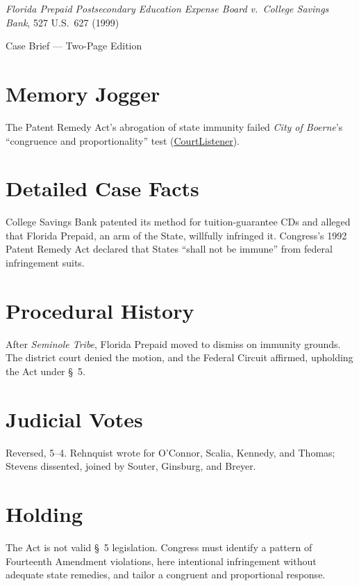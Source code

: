 \documentclass[12pt]{article}
\begin{document}
\begin{center}
{\LARGE \textit{Florida Prepaid Postsecondary Education Expense Board v.\ College Savings Bank}, 527 U.S.\ 627 (1999)\par}
\vspace{0.5em}
{\large Case Brief --- Two-Page Edition\par}
\end{center}

\section{Memory Jogger}
The Patent Remedy Act's abrogation of state immunity failed \textit{City of Boerne}'s ``congruence and proportionality'' test (\href{https://www.courtlistener.com/opinion/118316/florida-prepaid-postsecondary-education-expense-board-v-college-savings/}{CourtListener}).

\section{Detailed Case Facts}
College Savings Bank patented its method for tuition-guarantee CDs and alleged that Florida Prepaid, an arm of the State, willfully infringed it. Congress's 1992 Patent Remedy Act declared that States ``shall not be immune'' from federal infringement suits.

\section{Procedural History}
After \textit{Seminole Tribe}, Florida Prepaid moved to dismiss on immunity grounds. The district court denied the motion, and the Federal Circuit affirmed, upholding the Act under \S~5.

\section{Judicial Votes}
Reversed, 5--4. Rehnquist wrote for O'Connor, Scalia, Kennedy, and Thomas; Stevens dissented, joined by Souter, Ginsburg, and Breyer.

\section{Holding}
The Act is not valid \S~5 legislation. Congress must identify a pattern of Fourteenth Amendment violations, here intentional infringement without adequate state remedies, and tailor a congruent and proportional response.
\end{document}
